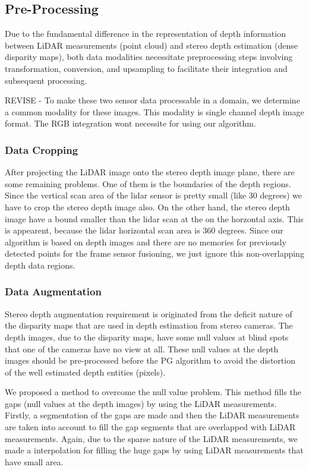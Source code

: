 \documentclass[conference]{IEEEtran}
\begin{document}
\subsection{Pre-Processing}

Due to the fundamental difference in the representation of depth information between LiDAR measurements (point cloud) and stereo depth estimation (dense disparity maps), both data modalities necessitate preprocessing steps involving transformation, conversion, and upsampling to facilitate their integration and subsequent processing.

REVISE - To make these two sensor data processable in a domain, we determine a common modality for these images. This modality is single channel depth image format. The RGB integration wont necessite for using our algorithm.

\subsubsection{Data Cropping}

After projecting the LiDAR image onto the stereo depth image plane, there are some remaining problems. One of them is the boundaries of the depth regions. Since the vertical scan area of the lidar sensor is pretty small (like 30 degrees) we have to crop the stereo depth image also. On the other hand, the stereo depth image have a bound smaller than the lidar scan at the on the horzontal axis. This is appearent, because the lidar horizontal scan area is 360 degrees. Since our algorithm is based on depth images and there are no memories for previously detected points for the frame sensor fusioning, we just ignore this non-overlapping depth data regions.

\subsubsection{Data Augmentation}

Stereo depth augmentation requirement is originated from the deficit nature of the disparity maps that are used in depth estimation from stereo cameras. The depth images, due to the disparity maps, have some null values at blind spots that one of the cameras have no view at all. These null values at the depth images should be pre-processed before the PG algorithm to avoid the distortion of the well estimated depth entities (pixels).

We proposed a method to overcome the null value problem. This method fills the gaps (null values at the depth images) by using the LiDAR measurements. Firstly, a segmentation of the gaps are made and then the LiDAR measurements are taken into account to fill the gap segments that are overlapped with LiDAR measurements. Again, due to the sparse nature of the LiDAR measurements, we made a interpolation for filling the huge gaps by using LiDAR measurements that have small area. 
\end{document}
